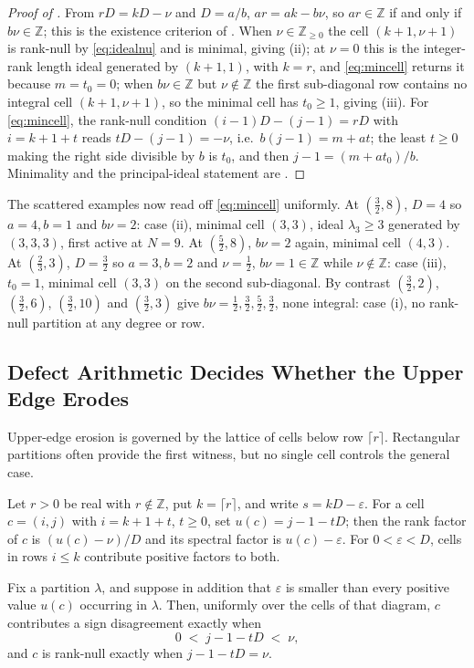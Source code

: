 \documentclass[11pt,letterpaper]{article}
\newcommand{\Zint}{\mathbb{Z}}
\begin{document}
\begin{proof}[Proof of ]
From $rD=kD-\nu$ and $D=a/b$, $ar=ak-b\nu$, so $ar\in\Zint$ if and only if
$b\nu\in\Zint$; this is the existence criterion of . When
$\nu\in\Zint_{\ge0}$ the cell $(k+1,\nu+1)$ is rank-null by \eqref{eq:idealnu}
and is minimal, giving (ii); at $\nu=0$ this is the integer-rank length ideal
generated by $(k+1,1)$, with $k=r$, and \eqref{eq:mincell} returns it because
$m=t_0=0$; when $b\nu\in\Zint$ but $\nu\notin\Zint$ the first sub-diagonal row
contains no integral cell $(k+1,\nu+1)$, so the minimal cell has $t_0\ge1$, giving (iii). For
\eqref{eq:mincell}, the rank-null condition $(i-1)D-(j-1)=rD$ with $i=k+1+t$ reads
$tD-(j-1)=-\nu$, i.e.\ $b(j-1)=m+at$; the least $t\ge0$ making the right side
divisible by $b$ is $t_0$, and then $j-1=(m+at_0)/b$. Minimality and the
principal-ideal statement are .
\end{proof}

The scattered examples now read off \eqref{eq:mincell} uniformly. At
$(\tfrac32,8)$, $D=4$ so $a=4,b=1$ and $b\nu=2$: case (ii), minimal cell $(3,3)$,
ideal $\lambda_3\ge3$ generated by $(3,3,3)$, first active at $N=9$. At
$(\tfrac52,8)$, $b\nu=2$ again, minimal cell $(4,3)$. At $(\tfrac23,3)$,
$D=\tfrac32$ so $a=3,b=2$ and $\nu=\tfrac12$, $b\nu=1\in\Zint$ while
$\nu\notin\Zint$: case (iii), $t_0=1$, minimal cell $(3,3)$ on the second
sub-diagonal. By contrast $(\tfrac32,2)$, $(\tfrac32,6)$, $(\tfrac32,10)$ and
$(\tfrac32,3)$ give $b\nu=\tfrac12,\tfrac32,\tfrac52,\tfrac32$, none integral:
case (i), no rank-null partition at any degree or row.


\subsection{Defect Arithmetic Decides Whether the Upper Edge Erodes}
Upper-edge erosion is governed by the lattice of cells below row
$\lceil r\rceil$. Rectangular partitions often provide the first witness, but no
single cell controls the general case.

\begin{lemma}
\label{lem:upper}
Let $r>0$ be real with $r\notin\Zint$, put $k=\lceil r\rceil$, and write
$s=kD-\varepsilon$. For a cell $c=(i,j)$ with $i=k+1+t$, $t\ge0$, set
$u(c)=j-1-tD$; then the rank factor of $c$ is $(u(c)-\nu)/D$ and its spectral
factor is $u(c)-\varepsilon$. For $0<\varepsilon<D$, cells in rows $i\le k$
contribute positive factors to both.

Fix a partition $\lambda$, and suppose in addition that $\varepsilon$ is smaller
than every positive value $u(c)$ occurring in $\lambda$. Then,
uniformly over the cells of that diagram, $c$ contributes a sign disagreement
exactly when
\begin{equation}
  0\;<\;j-1-tD\;<\;\nu,
  \label{eq:upperlattice}
\end{equation}
and $c$ is rank-null exactly when $j-1-tD=\nu$.
\end{lemma}
\end{document}
